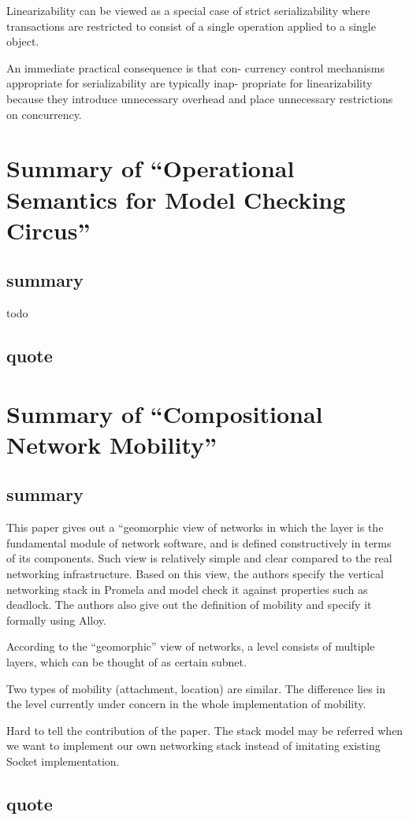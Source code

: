 \documentclass{llncs}
\begin{document}
Linearizability can be viewed as a special case of strict serializability where
transactions are restricted to consist of a single operation applied to a single
object. 

An immediate practical consequence is that con-
currency control mechanisms appropriate for serializability are typically inap-
propriate for linearizability because they introduce unnecessary overhead and
place unnecessary restrictions on concurrency. 

\section{Summary of ``Operational Semantics for Model Checking 
Circus''\cite{Woodcock2005Operational}} 
  \label{section:operational_circus}
\subsection{summary}
todo

\subsection{quote}

\section{Summary of ``Compositional Network Mobility''\cite{ZaveCompositional}} 
  \label{section:CNM}
\subsection{summary}
This paper gives out a ``geomorphic view of networks in which the layer is the
fundamental module of network software, and is defined constructively in terms
of its components. Such view is relatively simple and clear compared to the real
networking infrastructure. Based on this view, the authors specify the vertical
networking stack in Promela and model check it against properties such as
deadlock. The authors also give out the definition of mobility and specify it
formally using Alloy.

According to the ``geomorphic'' view of networks, a level consists of multiple
layers, which can be thought of as certain subnet.

Two types of mobility (attachment, location) are similar. The difference lies in
the level currently under concern in the whole implementation of mobility.

Hard to tell the contribution of the paper. The stack model may be referred when
we want to implement our own networking stack instead of imitating existing
Socket implementation.



\subsection{quote}
\newpage
% 
% 


 
\end{document}
